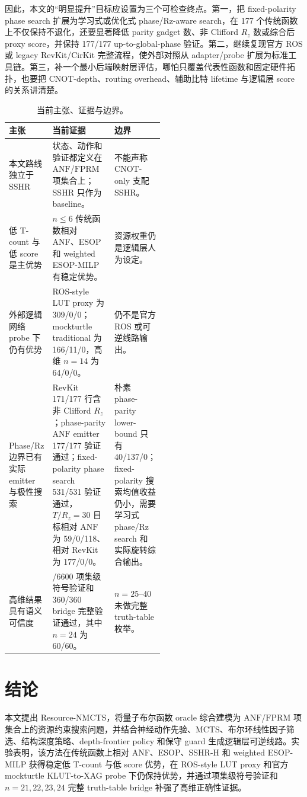 \documentclass[UTF8,fontset=macnew,11pt]{ctexart}
\newcommand{\method}{Resource-NMCTS}
\newcommand{\anf}{\ensuremath{\mathrm{ANF}}}
\newcommand{\fprm}{\ensuremath{\mathrm{FPRM}}}
\newcommand{\mcts}{\ensuremath{\mathrm{MCTS}}}
\newcommand{\rz}{\ensuremath{R_z}}
\newcommand{\ttable}{truth-table}
\begin{document}
因此，本文的“明显提升”目标应设置为三个可检查终点。第一，把 fixed-polarity phase search 扩展为学习式或优化式 phase/Rz-aware search，在 177 个传统函数上不仅保持不退化，还要显著降低 parity gadget 数、非 Clifford \rz{} 数或综合后 proxy score，并保持 177/177 up-to-global-phase 验证。第二，继续复现官方 ROS 或 legacy RevKit/CirKit 完整流程，使外部对照从 adapter/probe 扩展为标准工具链。第三，补一个最小后端映射层评估，哪怕只覆盖代表性函数和固定硬件拓扑，也要把 CNOT-depth、routing overhead、辅助比特 lifetime 与逻辑层 score 的关系讲清楚。

\begin{table}[H]
\centering
\small
\caption{当前主张、证据与边界。}
\label{tab:evidence-map}
\begin{tabularx}{\linewidth}{>{\raggedright\arraybackslash}p{0.27\linewidth}>{\raggedright\arraybackslash}X>{\raggedright\arraybackslash}p{0.25\linewidth}}
\toprule
主张 & 当前证据 & 边界 \\
\midrule
本文路线独立于 SSHR & 状态、动作和验证都定义在 \anf{}/\fprm{} 项集合上；SSHR 只作为 baseline。 & 不能声称 CNOT-only 支配 SSHR。 \\
低 T-count 与低 score 是主优势 & $n\leq6$ 传统函数相对 ANF、ESOP 和 weighted ESOP-MILP 有稳定优势。 & 资源权重仍是逻辑层人为设定。 \\
外部逻辑网络 probe 下仍有优势 & ROS-style LUT proxy 为 309/0/0；mockturtle traditional 为 166/11/0，高维 $n=14$ 为 64/0/0。 & 仍不是官方 ROS 或可逆线路输出。 \\
Phase/Rz 边界已有实际 emitter 与极性搜索 & RevKit 171/177 行含非 Clifford \rz{}；phase-parity \anf{} emitter 177/177 验证通过；fixed-polarity phase search 531/531 验证通过，$T/R_z=30$ 目标相对 \anf{} 为 59/0/118、相对 RevKit 为 177/0/0。 & 朴素 phase-parity lower-bound 只有 40/137/0；fixed-polarity 搜索均值收益仍小，需要学习式 phase/Rz search 和实际旋转综合输出。 \\
高维结果具有语义可信度 & 6600/6600 项集级符号验证和 360/360 bridge 完整验证通过，其中 $n=24$ 为 60/60。 & $n=25$--$40$ 未做完整 \ttable{} 枚举。 \\
\bottomrule
\end{tabularx}
\end{table}

\section{结论}

本文提出 \method{}，将量子布尔函数 oracle 综合建模为 \anf{}/\fprm{} 项集合上的资源约束搜索问题，并结合神经动作先验、\mcts{}、布尔环线性因子筛选、结构深度策略、depth-frontier policy 和保守 guard 生成逻辑层可逆线路。实验表明，该方法在传统函数上相对 ANF、ESOP、SSHR-H 和 weighted ESOP-MILP 获得稳定低 T-count 与低 score 优势，在 ROS-style LUT proxy 和官方 mockturtle KLUT-to-XAG probe 下仍保持优势，并通过项集级符号验证和 $n=21,22,23,24$ 完整 truth-table bridge 补强了高维正确性证据。
\end{document}

